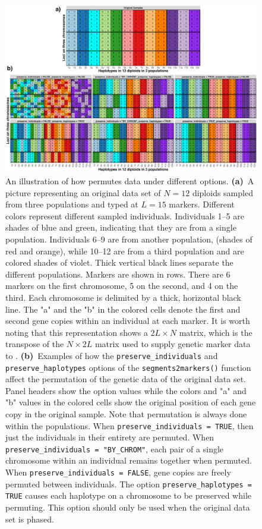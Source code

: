 \newcommand{\permcap}{\footnotesize An illustration of how \gscramble{} permutes data under
different options.  {\bf (a)}~A picture
representing an original data set of $N=12$ diploids sampled from three populations and typed at $L=15$ markers.
Different colors represent different sampled individuals. Individuals 1--5 are shades of blue and green, indicating that they
are from a single population.  Individuals 6--9 are from another population, (shades of red and orange), while 10--12
are from a third population and are colored shades of violet. Thick vertical black lines separate the different
populations.  Markers are shown in rows. There are 6 markers on the first chromosome, 5 on the second, and 4 on the
third.  Each chromosome is delimited by a thick, horizontal black line. The "a" and the "b" in the colored cells denote the first and second gene copies within an individual at each marker.  It is worth noting that this representation shows a $2L \times N$ matrix,
which is the transpose of the $N\times 2L$ matrix used to supply genetic marker data to \gscramble{}. {\bf (b)}~Examples of how the {\tt\footnotesize preserve\_individuals} and {\tt\footnotesize preserve\_haplotypes} options of the {\tt\footnotesize segments2markers()}
function affect the permutation of
the genetic data of the original data set.  Panel headers show the option values while the colors and "a" and "b" values
in the colored cells show the original position of each gene copy in the original sample.  Note that permutation is always
done within the populations.  When {\tt\footnotesize preserve\_individuals = TRUE},  then just the
individuals in their entirety are permuted.  When {\tt\footnotesize preserve\_individuals = "BY\_CHROM"}, each pair
of a single chromosome within an individual remains together when permuted. When {\tt\footnotesize preserve\_individuals = FALSE}, gene copies are freely permuted between individuals.  The option {\tt\footnotesize preserve\_haplotypes = TRUE} causes each haplotype on a chromosome to be preserved
while permuting. This option should only be used when the original data set is phased.
}
\begin{figure}
\includegraphics[width=\textwidth]{figures/permutations-plot.png}
\caption[\permcap]{\permcap}
\label{fig:perms}
\end{figure}



